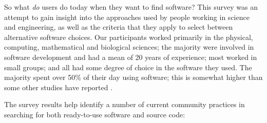 \documentclass[review]{elsarticle}
\begin{document}
So what \emph{do} users do today when they want to find software?  This survey was an attempt to gain insight into the approaches used by people working in science and engineering, as well as the criteria that they apply to select between alternative software choices.  Our participants worked primarily in the physical, computing, mathematical and biological sciences; the majority were involved in software development and had a mean of 20 years of experience; most worked in small groups; and all had some degree of choice in the software they used.  The majority spent over 50\% of their day using software; this is somewhat higher than some other studies have reported  \citep[e.g.,][found scientists spent 40\% of their time using scientific software]{hannay_2009}.

The survey results help identify a number of current community practices in searching for both ready-to-use software and source code:
\end{document}

